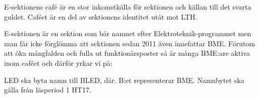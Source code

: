 \documentclass[../_main/handlingar.tex]{subfiles}
\begin{document}

E-sektionens café är en stor inkomstkälla för sektionen och källan till det svarta guldet. Caféet är en del av sektionens identitet utåt mot LTH.

E-sektionen är en sektion som bär namnet efter Elektroteknik-programmet men man får icke förglömma att sektionen sedan 2011 även innefattar BME. Förutom att öka mångfalden och fulla ut funktionärsposter så är många BME:are aktiva inom caféet och därför yrkar vi på:

\begin{attsatser}
    \att LED ska byta namn till BLED, där. B:et representerar BME. Namnbytet ska gälla från läsperiod 1 HT17.
\end{attsatser}

\begin{signatures}{1}
    \mvh
    \signature{Godtycklig BME:are}{}
\end{signatures}
\end{document}
